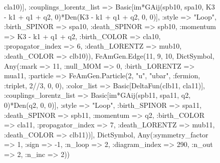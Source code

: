 \documentclass{revtex4}
\begin{document}
\begin{figure}[!htb]
\begin{center}
{cla10)], :couplings_lorentz_list => Basic[im*GAij(spb10, spa10, K3 - k1 + q1 + q2, 0)*Den(K3 - k1 + q1 + q2, 0, 0)], :style => "Loop", :birth_SPINOR => spa10, :death_SPINOR => spb10, :momentum => K3 - k1 + q1 + q2, :birth_COLOR => cla10, :propagator_index => 6, :death_LORENTZ => mub10, :death_COLOR => clb10)), FeAmGen.Edge(11, 9, 10, Dict{Symbol, Any}(:mark => 11, :null_MOM => 0, :birth_LORENTZ => mua11, :particle => FeAmGen.Particle(2, "u", "ubar", :fermion, :triplet, 2//3, 0, 0), :color_list => Basic[DeltaFun(clb11, cla11)], :couplings_lorentz_list => Basic[im*GAij(spb11, spa11, q2, 0)*Den(q2, 0, 0)], :style => "Loop", :birth_SPINOR => spa11, :death_SPINOR => spb11, :momentum => q2, :birth_COLOR => cla11, :propagator_index => 7, :death_LORENTZ => mub11, :death_COLOR => clb11))], Dict{Symbol, Any}(:symmetry_factor => 1, :sign => -1, :n_loop => 2, :diagram_index => 290, :n_out => 2, :n_inc => 2)) 
}
\end{center}
\end{figure}
\end{document}
